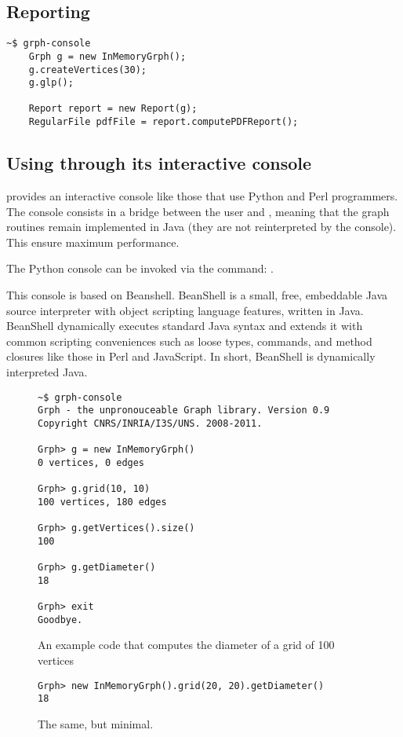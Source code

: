 \documentclass{article}
\begin{document}
\subsection{Reporting}

\begin{lstlisting}
~$ grph-console 
	Grph g = new InMemoryGrph();
	g.createVertices(30);
	g.glp();

	Report report = new Report(g);
	RegularFile pdfFile = report.computePDFReport();
\end{lstlisting}


\subsection{Using \grph through its interactive console}

\grph provides an interactive console like those that use Python and Perl programmers.
The console consists in a bridge between the user and \grph, meaning that
the graph routines remain implemented in Java (they are not reinterpreted by the console).
This ensure maximum performance.

The \grph Python console can be invoked via the command: .

This console is based on Beanshell.
BeanShell is a small, free, embeddable Java source interpreter with object scripting language features, written in Java.
BeanShell dynamically executes standard Java syntax and extends it with common scripting conveniences such as loose types, commands, and method closures like those in Perl and JavaScript. 
In short, BeanShell is dynamically interpreted Java.

\begin{figure}
\begin{lstlisting}
~$ grph-console 
Grph - the unpronouceable Graph library. Version 0.9
Copyright CNRS/INRIA/I3S/UNS. 2008-2011.

Grph> g = new InMemoryGrph()
0 vertices, 0 edges

Grph> g.grid(10, 10)
100 vertices, 180 edges

Grph> g.getVertices().size()
100

Grph> g.getDiameter()
18

Grph> exit
Goodbye.
\end{lstlisting}
\caption{An example code that computes the diameter of a grid of 100 vertices}
\end{figure}


\begin{figure}
\begin{lstlisting}
Grph> new InMemoryGrph().grid(20, 20).getDiameter()
18

\end{lstlisting}
\caption{The same, but minimal.}
\end{figure}
\end{document}
